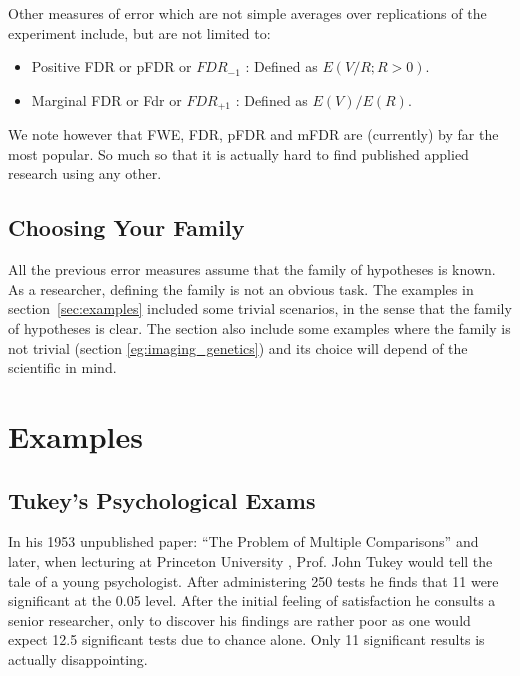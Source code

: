 \documentclass[draft,12pt]{article}
\begin{document}
Other measures of error which are not simple averages over replications of the experiment include, but are not limited to:
\begin{itemize}
\item Positive FDR or pFDR \citep{storey_direct_2002} or $FDR_{-1}$ \citep{benjamini_discovering_2010} : Defined as $E(V/R;R>0)$.
\item Marginal FDR \citep{sun_oracle_2007} or Fdr \citep{efron_microarrays_2008} or $FDR_{+1}$ \citep{benjamini_discovering_2010}: Defined as $E(V)/E(R)$.
\end{itemize}

We note however that FWE, FDR, pFDR and mFDR are (currently) by far the most popular. So much so that it is actually hard to find published applied research using any other. 



\subsection{Choosing Your Family}
All the previous error measures assume that the family of hypotheses is known. As a researcher, defining the family is not an obvious task. The examples in section~\ref{sec:examples} included some trivial scenarios, in the sense that the family of hypotheses is clear. The section also include some examples where the family is not trivial (section \ref{eg:imaging_genetics}) and its choice will depend of the scientific in mind.




\section{\label{sec:examples}Examples}



\subsection{Tukey's Psychological Exams}
In his 1953 unpublished paper: ``The Problem of Multiple Comparisons'' \citep{benjamini_john_2002} and later, when lecturing at Princeton University \citet{donoho_higher_2004}, Prof. John Tukey would tell the tale of a young psychologist. After administering 250 tests he finds that 11 were significant at the 0.05 level. After the initial feeling of satisfaction he consults a senior researcher, only to discover his findings are rather poor as one  would expect 12.5 significant tests due to chance alone. Only 11 significant results is actually disappointing.
\end{document}

